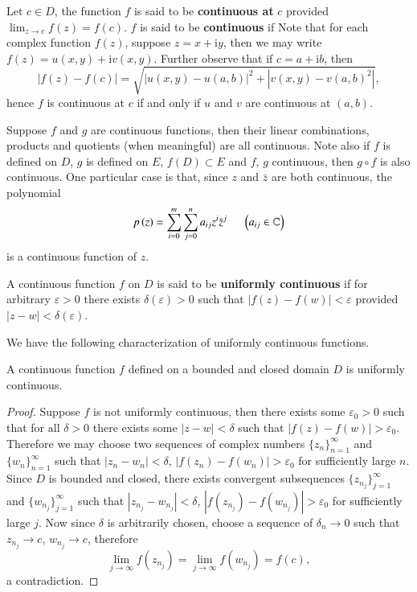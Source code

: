 Let $c\in D$, the function $f$ is said to be \textbf{continuous at} $c$ provided $\lim_{z\to c}f(z)=f(c)$. $f$ is said to be \textbf{continuous} if  Note that for each complex function $f(z)$, suppose $z=x+\mathrm{i}y$, then we may write $f(z)=u(x,y)+\mathrm{i}v(x,y)$. Further observe that if $c=a+\mathrm{i}b$, then
$$
\left| f\left( z \right) -f\left( c \right) \right|=\sqrt{\left| u\left( x,y \right) -u\left( a,b \right) \right|^2+\left| v\left( x,y \right) -v\left( a,b \right) ^2 \right|},
$$
hence $f$ is continuous at $c$ if and only if $u$ and $v$ are continuous at $(a,b)$.\par
Suppose $f$ and $g$ are continuous functions, then their linear combinations, products and quotients (when meaningful) are all continuous. Note also if $f$ is defined on $D$, $g$ is defined on $E$, $f(D)\subset E$ and $f$, $g$ continuous, then $g\circ f$ is also continuous. One particular case is that, since $z$ and $\bar{z}$ are both continuous, the polynomial 
$$
p\left( z \right) =\sum_{i=0}^m{\sum_{j=0}^n{a_{ij}z^i\bar{z}^j}}\hspace{0.5cm}\left( a_{ij}\in \mathbb{C} \right) 
$$
is a continuous function of $z$.
\begin{definition}
A continuous function $f$ on $D$ is said to be \textbf{uniformly continuous} if for arbitrary $\varepsilon>0$ there exists $\delta(\varepsilon)>0$ such that $|f(z)-f(w)|<\varepsilon$ provided $|z-w|<\delta(\varepsilon)$.
\end{definition}
We have the following characterization of uniformly continuous functions.
\begin{theorem}
A continuous function $f$ defined on a bounded and closed domain $D$ is uniformly continuous.
\end{theorem}
\begin{proof}
Suppose $f$ is not uniformly continuous, then there exists some $\varepsilon_0>0$ such that for all $\delta>0$ there exists some $|z-w|<\delta$ such that $|f(z)-f(w)|>\varepsilon_0$. Therefore we may choose two sequences of complex numbers $\{z_n\}_{n=1}^\infty$ and $\{w_n\}_{n=1}^\infty$ such that $|z_n-w_n|<\delta$, $|f(z_n)-f(w_n)|>\varepsilon_0$ for sufficiently large $n$. Since $D$ is bounded and closed, there exists convergent subsequences $\{z_{n_j}\}_{j=1}^\infty$ and $\{w_{n_j}\}_{j=1}^\infty$ such that $|z_{n_j}-w_{n_j}|<\delta$, $|f(z_{n_j})-f(w_{n_j})|>\varepsilon_0$ for sufficiently large $j$. Now since $\delta$ is arbitrarily chosen, choose a sequence of $\delta_n\to 0$ such that $z_{n_j}\to c$, $w_{n_j}\to c$, therefore 
$$
\lim_{j\rightarrow \infty} f\left( z_{n_j} \right) =\lim_{j\rightarrow \infty} f\left( w_{n_j} \right) =f\left( c \right) ,
$$
a contradiction.
\end{proof}
